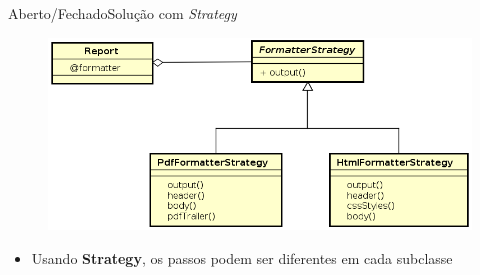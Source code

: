 \documentclass[10pt]{beamer}
\begin{document}

\begin{frame}[fragile]{Aberto/Fechado}{Solução com \textit{Strategy}}

\begin{figure}
  \includegraphics[width=1.0\textwidth]{images/strategyPattern.png}
\end{figure}

\begin{itemize}
  \item Usando \textbf{Strategy}, os passos podem ser diferentes em cada subclasse
\end{itemize}

\end{frame}

\end{document}
